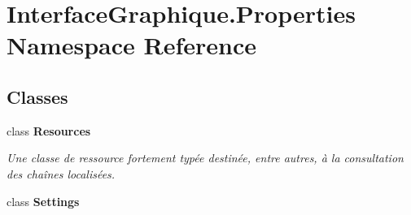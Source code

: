 \hypertarget{namespace_interface_graphique_1_1_properties}{}\section{Interface\+Graphique.\+Properties Namespace Reference}
\label{namespace_interface_graphique_1_1_properties}
\subsection*{Classes}
\begin{DoxyCompactItemize}
\item 
class {\bfseries Resources}
\begin{DoxyCompactList}\small\item\em Une classe de ressource fortement typée destinée, entre autres, à la consultation des chaînes localisées. \end{DoxyCompactList}\item 
class {\bfseries Settings}
\end{DoxyCompactItemize}
